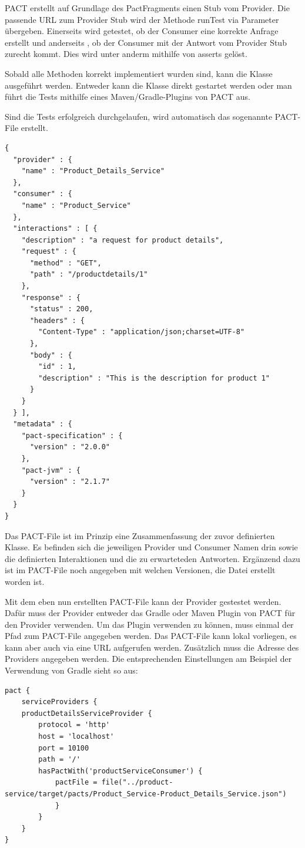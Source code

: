 \documentclass{llncs}
\begin{document}
PACT erstellt auf Grundlage des PactFragments einen Stub vom Provider. Die passende URL zum Provider Stub wird der Methode runTest via Parameter übergeben. Einerseits wird getestet, ob der Consumer eine korrekte Anfrage erstellt und anderseits , ob der Consumer mit der Antwort vom Provider Stub zurecht kommt. Dies wird unter anderm mithilfe von asserts gelöst.

Sobald alle Methoden korrekt implementiert wurden sind, kann die Klasse ausgeführt werden. Entweder kann die Klasse direkt gestartet werden oder man führt die Tests mithilfe eines Maven/Gradle-Plugins von PACT aus.

Sind die Tests erfolgreich durchgelaufen, wird automatisch das sogenannte PACT-File erstellt.

\lstset{language = Java}
\begin{lstlisting}
{
  "provider" : {
    "name" : "Product_Details_Service"
  },
  "consumer" : {
    "name" : "Product_Service"
  },
  "interactions" : [ {
    "description" : "a request for product details",
    "request" : {
      "method" : "GET",
      "path" : "/productdetails/1"
    },
    "response" : {
      "status" : 200,
      "headers" : {
        "Content-Type" : "application/json;charset=UTF-8"
      },
      "body" : {
        "id" : 1,
        "description" : "This is the description for product 1"
      }
    }
  } ],
  "metadata" : {
    "pact-specification" : {
      "version" : "2.0.0"
    },
    "pact-jvm" : {
      "version" : "2.1.7"
    }
  }
}
\end{lstlisting}

Das PACT-File ist im Prinzip eine Zusammenfassung der zuvor definierten Klasse. Es befinden sich die jeweiligen Provider und Consumer Namen drin sowie die definierten Interaktionen und die zu erwarteteden Antworten. Ergänzend dazu ist im PACT-File noch angegeben mit welchen Versionen, die Datei erstellt worden ist.

Mit dem eben nun erstellten PACT-File kann der Provider gestestet werden. Dafür muss der Provider entweder das Gradle oder Maven Plugin von PACT für den Provider verwenden. Um das Plugin verwenden zu können, muss einmal der Pfad zum PACT-File angegeben werden. Das PACT-File kann lokal vorliegen, es kann aber auch via eine URL aufgerufen werden. Zusätzlich muss die Adresse des Providers angegeben werden. Die entsprechenden Einstellungen am Beispiel der Verwendung von Gradle sieht so aus:

\lstset{language = Java}
\begin{lstlisting}
pact {
    serviceProviders {
    productDetailsServiceProvider {
        protocol = 'http'
        host = 'localhost'
        port = 10100
        path = '/'
        hasPactWith('productServiceConsumer') {
            pactFile = file("../product-service/target/pacts/Product_Service-Product_Details_Service.json")
			}
		}
	}
}
\end{lstlisting}
\end{document}
